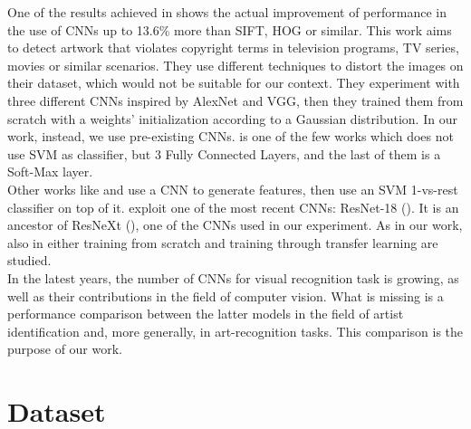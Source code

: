 \documentclass{article}
\begin{document}
One of the results achieved in \cite{hong2017} shows the actual improvement of performance in the use of CNNs up to 13.6\% more than SIFT, HOG or similar.  This work aims to detect artwork that violates copyright terms in television programs, TV series, movies or similar scenarios. They use different techniques to distort the images on their dataset, which would not be suitable for our context. They experiment with three different CNNs inspired by AlexNet and VGG, then they trained them from scratch with a weights' initialization according to a Gaussian distribution. In our work, instead, we use pre-existing CNNs. \cite{hong2017} is one of the few works which does not use SVM as classifier, but 3 Fully Connected Layers, and the last of them is a Soft-Max layer.\\
Other works like \cite{Bar2014} and \cite{razavian2014} use a CNN to generate features, then use an SVM 1-vs-rest classifier on top of it.
\cite{ArtistIdCNN406} exploit one of the most recent CNNs: ResNet-18 (\cite{resnet}). It is an ancestor of ResNeXt (\cite{resneXt}), one of the CNNs used in our experiment. As in our work, also in \cite{ArtistIdCNN406} either training from scratch and training through transfer learning are studied.
\\

In the latest years, the number of CNNs for visual recognition task is growing, as well as their contributions in the field of computer vision. What is missing is a performance comparison between the latter models in the field of artist identification and, more generally, in art-recognition tasks. This comparison is the purpose of our work.


\section{Dataset}\label{dataset}
\end{document}
